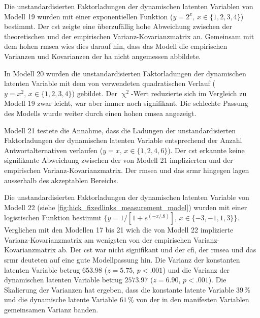 \documentclass[11pt, twoside, a4paper]{book}		%
\begin{document}
Die unstandardisierten Faktorladungen der dynamischen latenten Variablen von Modell 19 wurden mit einer exponentiellen Funktion ($y=2^x,\,x\in\{1, 2, 3, 4\}$) bestimmt. Der \gls{cst} zeigte eine überzufällig hohe Abweichung zwischen der theoretischen und der empirischen Var\-ianz-Ko\-var\-ianz\-ma\-trix an. Gemeinsam mit dem hohen \gls{rmsea} wies dies darauf hin, dass das Modell die empirischen Varianzen und Kovarianzen der \gls{ha} nicht angemessen abbildete.

In Modell 20 wurden die unstandardisierten Faktorladungen der dynamischen latenten Variable mit dem von \citet{Schweizer2006a} verwendeten quadratischen Verlauf ($y=x^2,\,x\in\{1, 2, 3, 4\}$) gebildet. Der $\upchi^2$-Wert reduzierte sich im Vergleich zu Modell 19 zwar leicht, war aber immer noch signifikant. Die schlechte Passung des Modells wurde weiter durch einen hohen \gls{rmsea} angezeigt.

Modell 21 testete die Annahme, dass die Ladungen der unstandardisierten Faktorladungen der dynamischen latenten Variable entsprechend der Anzahl Antwortalternativen verlaufen ($y=x,\,x\in\{1, 2, 4, 6\}$). Der \gls{cst} erkannte keine signifikante Abweichung zwischen der von Modell 21 implizierten und der empirischen Var\-ianz-Ko\-var\-ianz\-ma\-trix. Der \gls{rmsea} und das \gls{srmr} hingegen lagen ausserhalb des akzeptablen Bereichs.

Die unstandardisierten Faktorladungen der dynamischen latenten Variable von Modell 22 (siehe \autoref{fig:hick_fixedlinks_measurement_model}) wurden mit einer logistischen Funktion bestimmt $\{y={1}/[{1 + e^{(-x/.8)}}],\,x\in\{-3,-1,1,3\}\}$. Verglichen mit den Modellen 17 bis 21 wich die von Modell 22 implizierte Var\-ianz-Ko\-var\-ianz\-ma\-trix am wenigsten von der empirischen Var\-ianz-Ko\-var\-ianz\-ma\-trix ab. Der \gls{cst} war nicht signifikant und der \gls{cfi}, der \gls{rmsea} und das \gls{srmr} deuteten auf eine gute Modellpassung hin. 
Die Varianz der konstanten latenten Variable betrug $653.98$ ($z=5.75$, $p<.001$) und die Varianz der dynamischen latenten Variable betrug $2573.97$ ($z=6.90$, $p<.001$). Die Skalierung der Varianzen \citep{Schweizer2011a} hat ergeben, dass die konstante latente Variable $39\,\%$ und die dynamische latente Variable $61\,\%$ von der in den manifesten Variablen gemeinsamen Varianz banden.
\end{document}
